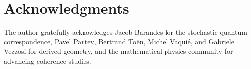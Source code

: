 \documentclass[12pt]{article}
\begin{document}
\section*{Acknowledgments}

The author gratefully acknowledges Jacob Barandes for the stochastic-quantum correspondence, Pavel Pantev, Bertrand Toën, Michel Vaquié, and Gabriele Vezzosi for derived geometry, and the mathematical physics community for advancing coherence studies.
\end{document}
